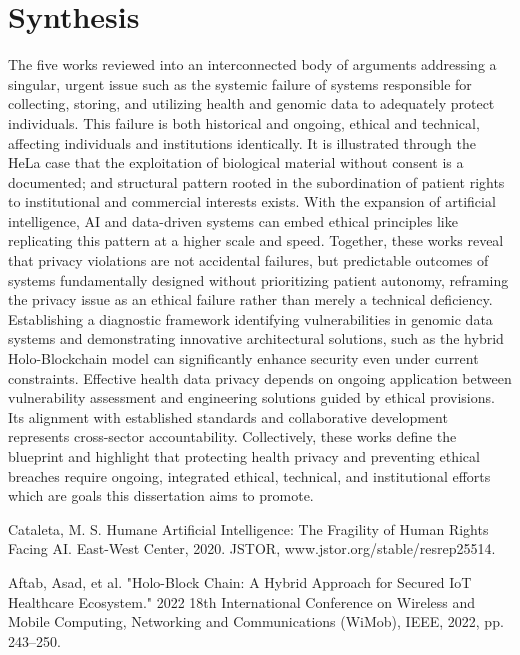 \documentclass[12pt]{article}
\begin{document}
\section{Synthesis}
The five works reviewed into an interconnected body of arguments addressing a singular, urgent issue such as the systemic failure of systems responsible for collecting, storing, and utilizing health and genomic data to adequately protect individuals. This failure is both historical and ongoing, ethical and technical, affecting individuals and institutions identically. It is illustrated through the HeLa case that the exploitation of biological material without consent is a documented; and structural pattern rooted in the subordination of patient rights to institutional and commercial interests exists. With the expansion of artificial intelligence, AI and data-driven systems can embed ethical principles like replicating this pattern at a higher scale and speed. Together, these works reveal that privacy violations are not accidental failures, but predictable outcomes of systems fundamentally designed without prioritizing patient autonomy, reframing the privacy issue as an ethical failure rather than merely a technical deficiency. Establishing a diagnostic framework identifying vulnerabilities in genomic data systems and demonstrating innovative architectural solutions, such as the hybrid Holo-Blockchain model can significantly enhance security even under current constraints. Effective health data privacy depends on ongoing application between vulnerability assessment and engineering solutions guided by ethical provisions. Its alignment with established standards and collaborative development represents cross-sector accountability. Collectively, these works define the blueprint and highlight that protecting health privacy and preventing ethical breaches require ongoing, integrated ethical, technical, and institutional efforts which are goals this dissertation aims to promote.



Cataleta, M. S. Humane Artificial Intelligence: The Fragility of Human Rights Facing AI. East-West Center, 2020. JSTOR, www.jstor.org/stable/resrep25514.

Aftab, Asad, et al. "Holo-Block Chain: A Hybrid Approach for Secured IoT Healthcare Ecosystem." 2022 18th International Conference on Wireless and Mobile Computing, Networking and Communications (WiMob), IEEE, 2022, pp. 243–250.
\end{document}
